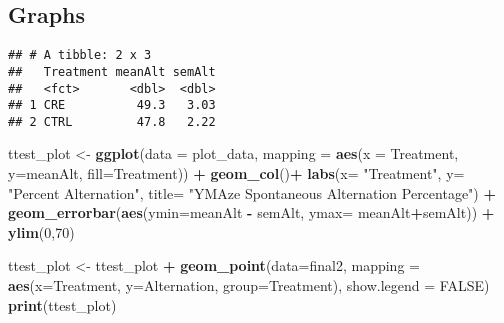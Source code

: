 \documentclass[]{article}
\newenvironment{Shaded}{\begin{snugshade}}{\end{snugshade}}
\newcommand{\ControlFlowTok}[1]{\textcolor[rgb]{0.13,0.29,0.53}{\textbf{#1}}}
\newcommand{\DataTypeTok}[1]{\textcolor[rgb]{0.13,0.29,0.53}{#1}}
\newcommand{\DecValTok}[1]{\textcolor[rgb]{0.00,0.00,0.81}{#1}}
\newcommand{\KeywordTok}[1]{\textcolor[rgb]{0.13,0.29,0.53}{\textbf{#1}}}
\newcommand{\NormalTok}[1]{#1}
\newcommand{\OperatorTok}[1]{\textcolor[rgb]{0.81,0.36,0.00}{\textbf{#1}}}
\newcommand{\OtherTok}[1]{\textcolor[rgb]{0.56,0.35,0.01}{#1}}
\newcommand{\StringTok}[1]{\textcolor[rgb]{0.31,0.60,0.02}{#1}}
\begin{document}
\hypertarget{graphs}{%
\subsection{Graphs}\label{graphs}}

\begin{Shaded}
\end{Shaded}

\begin{verbatim}
## # A tibble: 2 x 3
##   Treatment meanAlt semAlt
##   <fct>       <dbl>  <dbl>
## 1 CRE          49.3   3.03
## 2 CTRL         47.8   2.22
\end{verbatim}

\begin{Shaded}
\begin{Highlighting}[]
\NormalTok{ttest_plot <-}\StringTok{  }\KeywordTok{ggplot}\NormalTok{(}\DataTypeTok{data =}\NormalTok{ plot_data,}
 \DataTypeTok{mapping =} \KeywordTok{aes}\NormalTok{(}\DataTypeTok{x =}\NormalTok{ Treatment, }\DataTypeTok{y=}\NormalTok{meanAlt, }\DataTypeTok{fill=}\NormalTok{Treatment)) }\OperatorTok{+}
\StringTok{ }\KeywordTok{geom_col}\NormalTok{()}\OperatorTok{+}
\StringTok{   }\KeywordTok{labs}\NormalTok{(}\DataTypeTok{x=} \StringTok{"Treatment"}\NormalTok{, }\DataTypeTok{y=} \StringTok{"Percent Alternation"}\NormalTok{, }\DataTypeTok{title=} \StringTok{"YMAze Spontaneous Alternation Percentage"}\NormalTok{) }\OperatorTok{+}
\StringTok{  }\KeywordTok{geom_errorbar}\NormalTok{(}\KeywordTok{aes}\NormalTok{(}\DataTypeTok{ymin=}\NormalTok{meanAlt }\OperatorTok{-}\StringTok{ }\NormalTok{semAlt, }\DataTypeTok{ymax=}\NormalTok{ meanAlt}\OperatorTok{+}\NormalTok{semAlt)) }\OperatorTok{+}
\StringTok{  }\KeywordTok{ylim}\NormalTok{(}\DecValTok{0}\NormalTok{,}\DecValTok{70}\NormalTok{)}

\NormalTok{ttest_plot <-}\StringTok{ }\NormalTok{ttest_plot }\OperatorTok{+}\StringTok{ }\KeywordTok{geom_point}\NormalTok{(}\DataTypeTok{data=}\NormalTok{final2, }\DataTypeTok{mapping =} \KeywordTok{aes}\NormalTok{(}\DataTypeTok{x=}\NormalTok{Treatment, }\DataTypeTok{y=}\NormalTok{Alternation, }\DataTypeTok{group=}\NormalTok{Treatment), }\DataTypeTok{show.legend =} \OtherTok{FALSE}\NormalTok{)}
\KeywordTok{print}\NormalTok{(ttest_plot)}
\end{Highlighting}
\end{Shaded}
\end{document}

